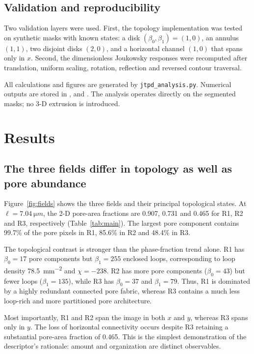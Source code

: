 \documentclass[preprint,12pt,authoryear]{elsarticle}
\begin{document}
\subsection{Validation and reproducibility}

Two validation layers were used. First, the topology implementation was tested on synthetic masks with known states: a disk $(\beta_0,\beta_1)=(1,0)$, an annulus $(1,1)$, two disjoint disks $(2,0)$, and a horizontal channel $(1,0)$ that spans only in $x$. Second, the dimensionless Joukowsky responses were recomputed after translation, uniform scaling, rotation, reflection and reversed contour traversal.

All calculations and figures are generated by \texttt{jtpd\_analysis.py}. Numerical outputs are stored in ,  and . The analysis operates directly on the segmented masks; no 3-D extrusion is introduced.

\section{Results}

\subsection{The three fields differ in topology as well as pore abundance}

Figure~\ref{fig:fields} shows the three fields and their principal topological states. At $\ell=\SI{7.04}{\micro m}$, the 2-D pore-area fractions are 0.907, 0.731 and 0.465 for R1, R2 and R3, respectively (Table~\ref{tab:main}). The largest pore component contains 99.7\% of the pore pixels in R1, 85.6\% in R2 and 48.4\% in R3.

The topological contrast is stronger than the phase-fraction trend alone. R1 has $\beta_0=17$ pore components but $\beta_1=255$ enclosed loops, corresponding to loop density \SI{78.5}{mm^{-2}} and $\chi=-238$. R2 has more pore components ($\beta_0=43$) but fewer loops ($\beta_1=135$), while R3 has $\beta_0=37$ and $\beta_1=79$. Thus, R1 is dominated by a highly redundant connected pore fabric, whereas R3 contains a much less loop-rich and more partitioned pore architecture.

Most importantly, R1 and R2 span the image in both $x$ and $y$, whereas R3 spans only in $y$. The loss of horizontal connectivity occurs despite R3 retaining a substantial pore-area fraction of 0.465. This is the simplest demonstration of the descriptor's rationale: amount and organization are distinct observables.
\end{document}
